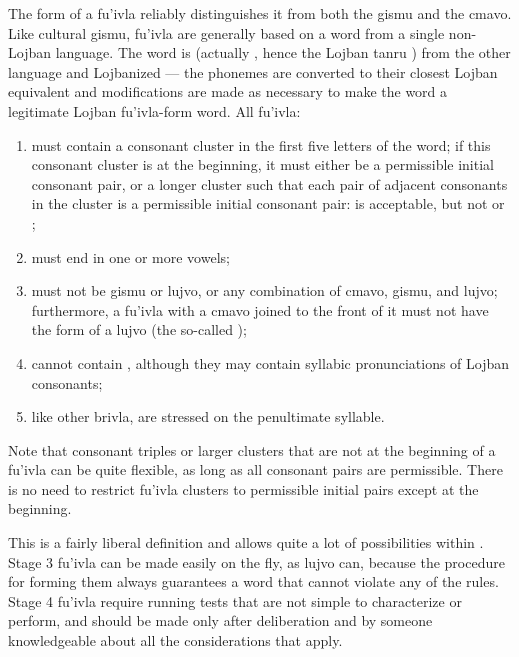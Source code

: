 The form of a fu'ivla reliably distinguishes it from both the gismu and the cmavo. Like cultural gismu, fu'ivla are generally based on a word from a single non-Lojban language. The word is  (actually , hence the Lojban tanru ) from the other language and Lojbanized --- the phonemes are converted to their closest Lojban equivalent and modifications are made as necessary to make the word a legitimate Lojban fu'ivla-form word. All fu'ivla:
\begin{enumerate}
\item must contain a consonant cluster in the first five letters of the word; if this consonant cluster is at the beginning, it must either be a permissible initial consonant pair, or a longer cluster such that each pair of adjacent consonants in the cluster is a permissible initial consonant pair:  is acceptable, but not  or ;
\item must end in one or more vowels;
\item must not be gismu or lujvo, or any combination of cmavo, gismu, and lujvo; furthermore, a fu'ivla with a  cmavo joined to the front of it must not have the form of a lujvo (the so-called );
\item cannot contain , although they may contain syllabic pronunciations of Lojban consonants;
\item like other brivla, are stressed on the penultimate syllable.
\end{enumerate}

Note that consonant triples or larger clusters that are not at the beginning of a fu'ivla can be quite flexible, as long as all consonant pairs are permissible. There is no need to restrict fu'ivla clusters to permissible initial pairs except at the beginning. 

This is a fairly liberal definition and allows quite a lot of possibilities within . Stage 3 fu'ivla can be made easily on the fly, as lujvo can, because the procedure for forming them always guarantees a word that cannot violate any of the rules. Stage 4 fu'ivla require running tests that are not simple to characterize or perform, and should be made only after deliberation and by someone knowledgeable about all the considerations that apply.

